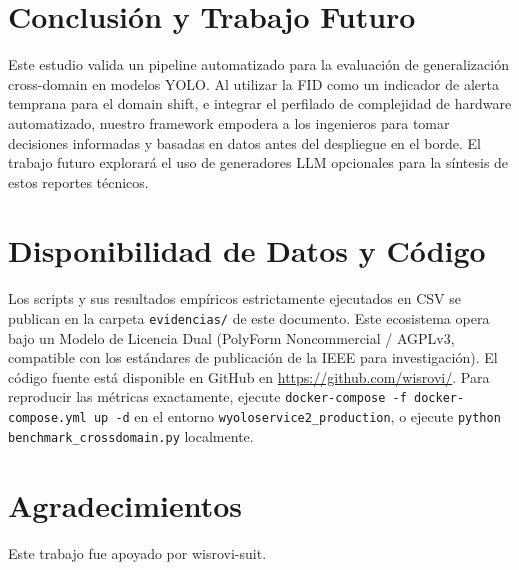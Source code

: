 \documentclass[conference]{IEEEtran}
\begin{document}
\section{Conclusión y Trabajo Futuro}
Este estudio valida un pipeline automatizado para la evaluación de generalización cross-domain en modelos YOLO. Al utilizar la FID como un indicador de alerta temprana para el domain shift, e integrar el perfilado de complejidad de hardware automatizado, nuestro framework empodera a los ingenieros para tomar decisiones informadas y basadas en datos antes del despliegue en el borde. El trabajo futuro explorará el uso de generadores LLM opcionales para la síntesis de estos reportes técnicos.

\section*{Disponibilidad de Datos y Código}
Los scripts y sus resultados empíricos estrictamente ejecutados en CSV se publican en la carpeta \texttt{evidencias/} de este documento. Este ecosistema opera bajo un Modelo de Licencia Dual (PolyForm Noncommercial / AGPLv3, compatible con los estándares de publicación de la IEEE para investigación). El código fuente está disponible en GitHub en \url{https://github.com/wisrovi/}. Para reproducir las métricas exactamente, ejecute \texttt{docker-compose -f docker-compose.yml up -d} en el entorno \texttt{wyoloservice2\_production}, o ejecute \texttt{python benchmark\_crossdomain.py} localmente.

\section*{Agradecimientos}
Este trabajo fue apoyado por wisrovi-suit.



\end{document}
